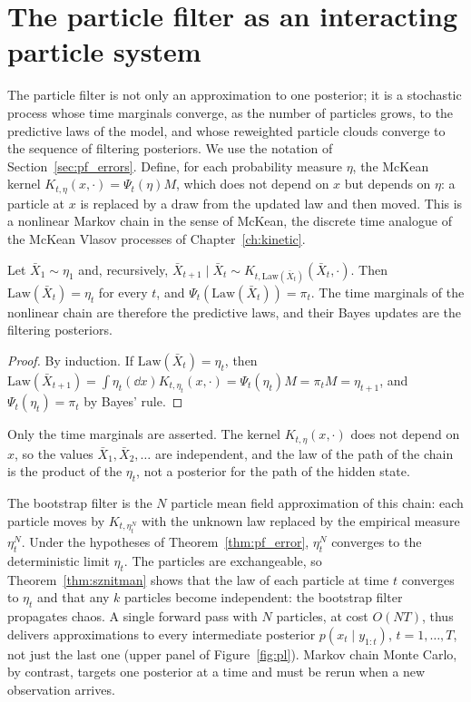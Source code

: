 \section{The particle filter as an interacting particle system}
\label{sec:pf_interacting}

The particle filter is not only an approximation to one posterior; it is a stochastic process whose time marginals converge, as the number of particles grows, to the predictive laws of the model, and whose reweighted particle clouds converge to the sequence of filtering posteriors. We use the notation of Section~\ref{sec:pf_errors}. Define, for each probability measure $\eta$, the McKean kernel $K_{t,\eta}(x,\cdot) = \Psi_t(\eta)M$, which does not depend on $x$ but depends on $\eta$: a particle at $x$ is replaced by a draw from the updated law and then moved. This is a nonlinear Markov chain in the sense of McKean, the discrete time analogue of the McKean Vlasov processes of Chapter~\ref{ch:kinetic}.

\begin{proposition}
\label{prop:pf_marginals}
Let $\bar X_1\sim\eta_1$ and, recursively, $\bar X_{t+1}\mid\bar X_t\sim K_{t,\mathrm{Law}(\bar X_t)}(\bar X_t,\cdot)$. Then $\mathrm{Law}(\bar X_t) = \eta_t$ for every $t$, and $\Psi_t(\mathrm{Law}(\bar X_t)) = \pi_t$. The time marginals of the nonlinear chain are therefore the predictive laws, and their Bayes updates are the filtering posteriors.
\end{proposition}

\begin{proof}
By induction. If $\mathrm{Law}(\bar X_t) = \eta_t$, then $\mathrm{Law}(\bar X_{t+1}) = \int\eta_t(\dd x)K_{t,\eta_t}(x,\cdot) = \Psi_t(\eta_t)M = \pi_tM = \eta_{t+1}$, and $\Psi_t(\eta_t) = \pi_t$ by Bayes' rule.
\end{proof}

Only the time marginals are asserted. The kernel $K_{t,\eta}(x,\cdot)$ does not depend on $x$, so the values $\bar X_1,\bar X_2,\dots$ are independent, and the law of the path of the chain is the product of the $\eta_t$, not a posterior for the path of the hidden state.

The bootstrap filter is the $N$ particle mean field approximation of this chain: each particle moves by $K_{t,\eta^N_t}$ with the unknown law replaced by the empirical measure $\eta^N_t$. Under the hypotheses of Theorem~\ref{thm:pf_error}, $\eta^N_t$ converges to the deterministic limit $\eta_t$. The particles are exchangeable, so Theorem~\ref{thm:sznitman} shows that the law of each particle at time $t$ converges to $\eta_t$ and that any $k$ particles become independent: the bootstrap filter propagates chaos. A single forward pass with $N$ particles, at cost $O(NT)$, thus delivers approximations to every intermediate posterior $p(x_t\mid y_{1:t})$, $t = 1,\dots,T$, not just the last one (upper panel of Figure~\ref{fig:pl}). Markov chain Monte Carlo, by contrast, targets one posterior at a time and must be rerun when a new observation arrives.


